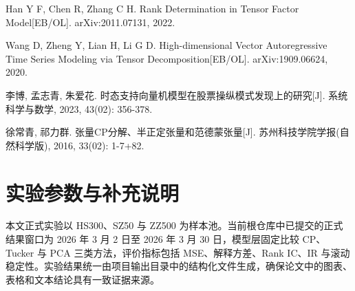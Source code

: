 \begin{enumerate}[label={[\arabic*]}]
  \item Han Y F, Chen R, Zhang C H. Rank Determination in Tensor Factor Model[EB/OL]. arXiv:2011.07131, 2022.
  \item Wang D, Zheng Y, Lian H, Li G D. High-dimensional Vector Autoregressive Time Series Modeling via Tensor Decomposition[EB/OL]. arXiv:1909.06624, 2020.
  \item 李博, 孟志青, 朱爱花. 时态支持向量机模型在股票操纵模式发现上的研究[J]. 系统科学与数学, 2023, 43(02): 356-378.
  \item 徐常青, 祁力群. 张量CP分解、半正定张量和范德蒙张量[J]. 苏州科技学院学报(自然科学版), 2016, 33(02): 1-7+82.
\end{enumerate}

\appendix
\chapter{实验参数与补充说明}

本文正式实验以 HS300、SZ50 与 ZZ500 为样本池。当前根仓库中已提交的正式结果窗口为 2026 年 3 月 2 日至 2026 年 3 月 30 日，模型层固定比较 CP、Tucker 与 PCA 三类方法，评价指标包括 MSE、解释方差、Rank IC、IR 与滚动稳定性。实验结果统一由项目输出目录中的结构化文件生成，确保论文中的图表、表格和文本结论具有一致证据来源。
